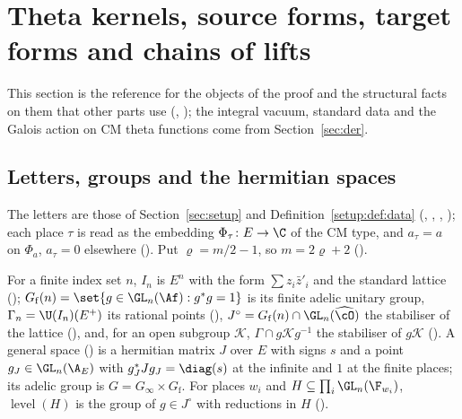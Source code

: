 \section{Theta kernels, source forms, target forms and chains of lifts}\label{sec:ub-objects}

This section is the reference for the objects of the proof and the structural facts on them that
other parts use (, ); the
integral vacuum, standard data and the Galois action on CM theta functions come from
Section~\ref{sec:der}.

\subsection{Letters, groups and the hermitian spaces}\label{ub-objects:sec:spaces}

The letters are those of Section~\ref{sec:setup} and Definition~\ref{setup:def:data} (,
, , ); each place $\tau$ is read as the
embedding $\Phi_\tau\colon E\to\C$ of the CM type, and $a_\tau=a$ on $\Phi_a$, $a_\tau=0$ elsewhere
(). Put $\varrho=m/2-1$, so $m=2\varrho+2$
().

For a finite index set $n$, $I_n$ is $E^n$ with the form $\sum z_i\bar z'_i$ and the standard lattice
(); $G_{\mathrm f}(n)=\set{g\in\GL_n(\Af):g^*g=1}$ is its finite adelic unitary group,
$\Gamma_n=\U(I_n)(E^+)$ its rational points (), $J^\circ=G_{\mathrm f}(n)\cap\GL_n(\widehat\cO)$
the stabiliser of the lattice (), and, for an open subgroup $\mathcal K$,
$\Gamma\cap g\mathcal Kg^{-1}$ the stabiliser of $g\mathcal K$ (). A general space
() is a hermitian matrix $J$ over $E$ with signs $s$ and a point
$g_J\in\GL_n(\A_E)$ with $g_J^*Jg_J=\diag(s)$ at the infinite and $1$ at the finite places; its
adelic group is $G=G_\infty\times G_{\mathrm f}$. For places $w_i$ and $H\subseteq\prod_i\GL_n(\F_{w_i})$,
$\operatorname{level}(H)$ is the group of $g\in J^\circ$ with reductions in $H$ ().

